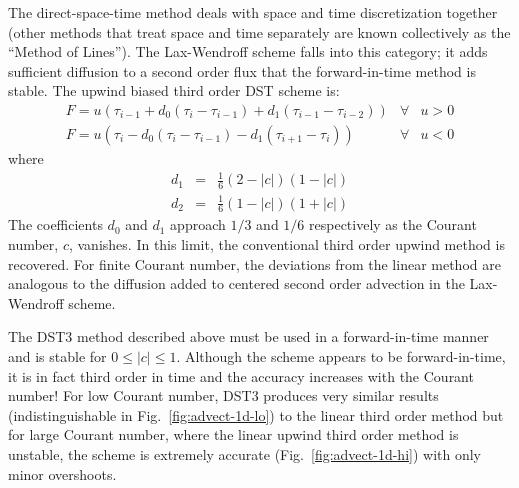 The direct-space-time method deals with space and time discretization
together (other methods that treat space and time separately are known
collectively as the ``Method of Lines''). The Lax-Wendroff scheme
falls into this category; it adds sufficient diffusion to a second
order flux that the forward-in-time method is stable. The upwind
biased third order DST scheme is:
\begin{eqnarray}
F = u \left( \tau_{i-1}
        + d_0 (\tau_{i}-\tau_{i-1}) + d_1 (\tau_{i-1}-\tau_{i-2}) \right)
& \forall & u > 0 \\
F = u \left( \tau_{i}
        - d_0 (\tau_{i}-\tau_{i-1}) - d_1 (\tau_{i+1}-\tau_{i}) \right)
& \forall & u < 0
\end{eqnarray}
where
\begin{eqnarray}
d_1 & = & \frac{1}{6} ( 2 - |c| ) ( 1 - |c| ) \\
d_2 & = & \frac{1}{6} ( 1 - |c| ) ( 1 + |c| )
\end{eqnarray}
The coefficients $d_0$ and $d_1$ approach $1/3$ and $1/6$ respectively
as the Courant number, $c$, vanishes. In this limit, the conventional
third order upwind method is recovered. For finite Courant number, the
deviations from the linear method are analogous to the diffusion added
to centered second order advection in the Lax-Wendroff scheme.

The DST3 method described above must be used in a forward-in-time
manner and is stable for $0 \le |c| \le 1$. Although the scheme
appears to be forward-in-time, it is in fact third order in time and
the accuracy increases with the Courant number! For low Courant
number, DST3 produces very similar results (indistinguishable in
Fig.~\ref{fig:advect-1d-lo}) to the linear third order method but for
large Courant number, where the linear upwind third order method is
unstable, the scheme is extremely accurate
(Fig.~\ref{fig:advect-1d-hi}) with only minor overshoots.



